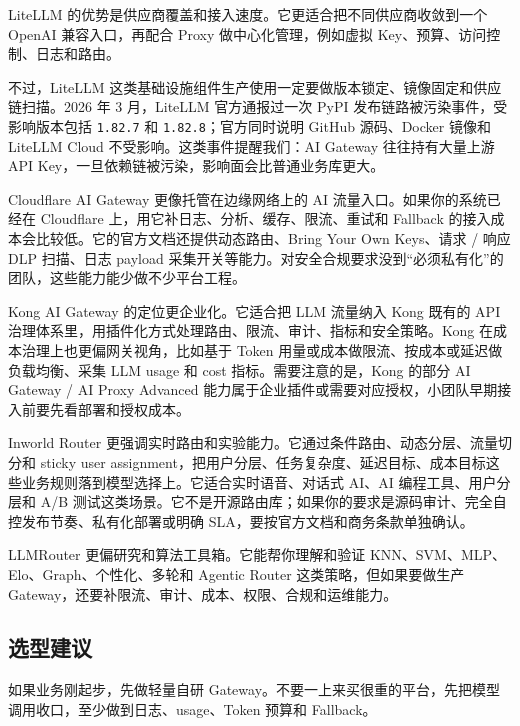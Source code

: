 \documentclass[10pt,a4paper]{ctexart}
\begin{document}
LiteLLM 的优势是供应商覆盖和接入速度。它更适合把不同供应商收敛到一个 OpenAI 兼容入口，再配合 Proxy 做中心化管理，例如虚拟 Key、预算、访问控制、日志和路由。



不过，LiteLLM 这类基础设施组件生产使用一定要做版本锁定、镜像固定和供应链扫描。2026 年 3 月，LiteLLM 官方通报过一次 PyPI 发布链路被污染事件，受影响版本包括 \texttt{1.82.7} 和 \texttt{1.82.8}；官方同时说明 GitHub 源码、Docker 镜像和 LiteLLM Cloud 不受影响。这类事件提醒我们：AI Gateway 往往持有大量上游 API Key，一旦依赖链被污染，影响面会比普通业务库更大。



Cloudflare AI Gateway 更像托管在边缘网络上的 AI 流量入口。如果你的系统已经在 Cloudflare 上，用它补日志、分析、缓存、限流、重试和 Fallback 的接入成本会比较低。它的官方文档还提供动态路由、Bring Your Own Keys、请求 / 响应 DLP 扫描、日志 payload 采集开关等能力。对安全合规要求没到“必须私有化”的团队，这些能力能少做不少平台工程。



Kong AI Gateway 的定位更企业化。它适合把 LLM 流量纳入 Kong 既有的 API 治理体系里，用插件化方式处理路由、限流、审计、指标和安全策略。Kong 在成本治理上也更偏网关视角，比如基于 Token 用量或成本做限流、按成本或延迟做负载均衡、采集 LLM usage 和 cost 指标。需要注意的是，Kong 的部分 AI Gateway / AI Proxy Advanced 能力属于企业插件或需要对应授权，小团队早期接入前要先看部署和授权成本。



Inworld Router 更强调实时路由和实验能力。它通过条件路由、动态分层、流量切分和 sticky user assignment，把用户分层、任务复杂度、延迟目标、成本目标这些业务规则落到模型选择上。它适合实时语音、对话式 AI、AI 编程工具、用户分层和 A/B 测试这类场景。它不是开源路由库；如果你的要求是源码审计、完全自控发布节奏、私有化部署或明确 SLA，要按官方文档和商务条款单独确认。



LLMRouter 更偏研究和算法工具箱。它能帮你理解和验证 KNN、SVM、MLP、Elo、Graph、个性化、多轮和 Agentic Router 这类策略，但如果要做生产 Gateway，还要补限流、审计、成本、权限、合规和运维能力。



\subsection{选型建议}


如果业务刚起步，先做轻量自研 Gateway。不要一上来买很重的平台，先把模型调用收口，至少做到日志、usage、Token 预算和 Fallback。
\end{document}
